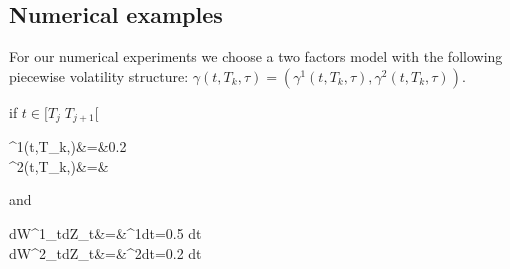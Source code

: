 \subsection{Numerical examples} 

For our numerical experiments we choose a two factors model with the following piecewise volatility structure: $\gamma(t,T_k,\tau)=(\gamma^1(t,T_k,\tau),\gamma^2(t,T_k,\tau))$.  


if $t\in [T_j \; T_{j+1}[$ 

\ban
\gamma^1(t,T_k,\tau)&=&0.2\\
\gamma^2(t,T_k,\tau)&=& 
\ean

and 

\ban
dW^1_tdZ_t&=&\rho^1dt=0.5 dt\\
dW^2_tdZ_t&=&\rho^2dt=0.2 dt
\ean

